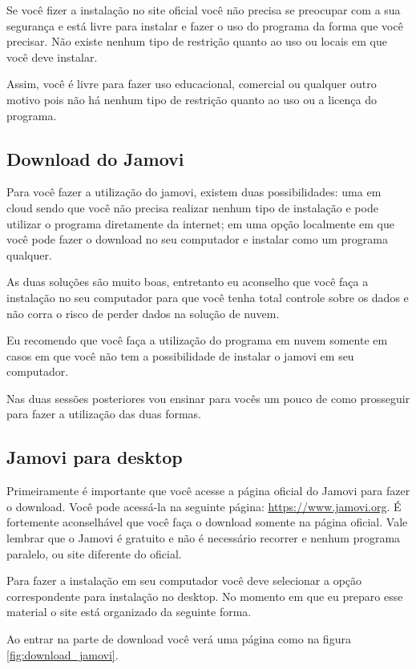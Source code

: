 Se você fizer a instalação no site oficial você não precisa se preocupar com a sua segurança e está livre para instalar e fazer o uso do programa da forma que você precisar. Não existe nenhum tipo de restrição quanto ao uso ou locais em que você deve instalar.

Assim, você é livre para fazer uso educacional, comercial ou qualquer outro motivo pois não há nenhum tipo de restrição quanto ao uso ou a licença do programa.

\subsection{Download do Jamovi}

Para você fazer a utilização do jamovi, existem duas possibilidades: uma em cloud sendo que você não precisa realizar nenhum tipo de instalação e pode utilizar o programa diretamente da internet; em uma opção localmente em que você pode fazer o download no seu computador e instalar como um programa qualquer.

As duas soluções são muito boas, entretanto eu aconselho que você faça a instalação no seu computador para que você tenha total controle sobre os dados e não corra o risco de perder dados na solução de nuvem.

Eu recomendo que você faça a utilização do programa em nuvem somente em casos em que você não tem a possibilidade de instalar o jamovi em seu computador.

Nas duas sessões posteriores vou ensinar para vocês um pouco de como prosseguir para fazer a utilização das duas formas.

\subsection{Jamovi para desktop}

Primeiramente é importante que você acesse a página oficial do Jamovi para fazer o download. Você pode acessá-la na seguinte página: \url{https://www.jamovi.org}. É fortemente aconselhável que você faça o download somente na página oficial. Vale lembrar que o Jamovi é gratuito e não é necessário recorrer e nenhum programa paralelo, ou site diferente do oficial.

Para fazer a instalação em seu computador você deve selecionar a opção correspondente para instalação no desktop. No momento em que eu preparo esse material o site está organizado da seguinte forma.

Ao entrar na parte de download você verá uma página como na figura \ref{fig:download_jamovi}.

